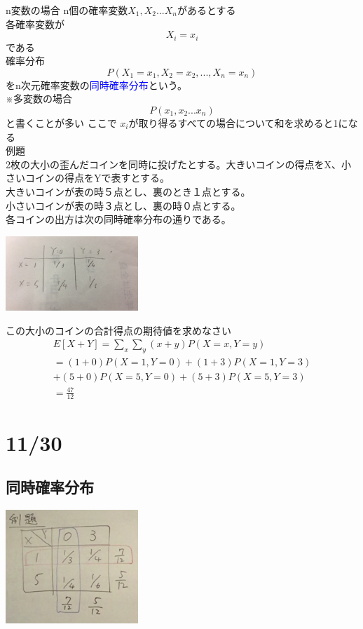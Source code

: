 \documentclass{jsarticle}
\begin{document}
		{\large{n変数の場合}}
		n個の確率変数$X_1,X_2...X_n$があるとする\\
		各確率変数が
		\[
			X_i=x_i
		\]
		である\\
		確率分布
		\[
			P(X_1=x_1,X_2=x_2,...,X_n=x_n)
		\]
		をn次元確率変数の{\textcolor{blue}{同時確率分布}}という。\\
		※多変数の場合
		\[
			P(x_1,x_2...x_n)
		\]
		と書くことが多い
		ここで
		$x_i$が取り得るすべての場合について和を求めると1になる\\
		{\Large{例題}}\\
		2枚の大小の歪んだコインを同時に投げたとする。大きいコインの得点をX、小さいコインの得点をYで表すとする。\\
		大きいコインが表の時５点とし、裏のとき１点とする。\\
		小さいコインが表の時３点とし、裏の時０点とする。\\
		各コインの出方は次の同時確率分布の通りである。\\
		\begin{center}
			\includegraphics[width=5cm]{11_9_4.JPG}
		\end{center}
		この大小のコインの合計得点の期待値を求めなさい\\
		\begin{eqnarray}
			E[X+Y]=\sum_x\sum_y(x+y)P(X=x,Y=y)\\
			=(1+0)P(X=1,Y=0)+(1+3)P(X=1,Y=3)\\
			+(5+0)P(X=5,Y=0)+(5+3)P(X=5,Y=3)\\
			=\frac{47}{12}
		\end{eqnarray}
\section{11/30}
\subsection{同時確率分布}
	\begin{center}
		\includegraphics[width=5cm]{11_30_1.JPG}
	\end{center}
\end{document}
